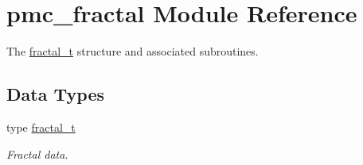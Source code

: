 \hypertarget{namespacepmc__fractal}{}\section{pmc\+\_\+fractal Module Reference}
\label{namespacepmc__fractal}


The \mbox{\hyperlink{structpmc__fractal_1_1fractal__t}{fractal\+\_\+t}} structure and associated subroutines.  


\subsection*{Data Types}
\begin{DoxyCompactItemize}
\item 
type \mbox{\hyperlink{structpmc__fractal_1_1fractal__t}{fractal\+\_\+t}}
\begin{DoxyCompactList}\small\item\em Fractal data. \end{DoxyCompactList}\end{DoxyCompactItemize}
